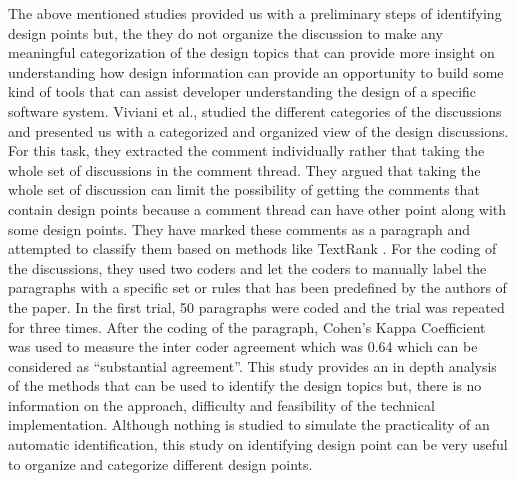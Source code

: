 The above mentioned studies provided us with a preliminary steps of identifying design points but, the they do not organize the discussion to make any meaningful categorization of the design topics that can provide more insight on understanding how design information can provide an opportunity to build some kind of tools that can assist developer understanding the design of a specific software system. Viviani et al.,\cite{Viviani2018} studied the different categories of the discussions and presented us with a categorized and organized view of the design discussions. For this task, they extracted the comment individually rather that taking the whole set of discussions in the comment thread. They argued that taking the whole set of discussion can limit the possibility of getting the comments that contain design points because a comment thread can have other point along with some design points. They have marked these comments as a paragraph and attempted to classify them based on methods like TextRank \cite{Mihalcea2004}. For the coding of the discussions, they used two coders and let the coders to manually label the paragraphs with a specific set or rules that has been predefined by the authors of the paper. In the first trial, 50 paragraphs were coded and the trial was repeated for three times. After the coding of the paragraph, Cohen's Kappa Coefficient was used to measure the inter coder agreement which was 0.64 which can be considered as ``substantial agreement''. This study provides an in depth analysis of the methods that can be used to identify the design topics but, there is no information on the approach, difficulty and feasibility of the technical implementation. Although nothing is studied to simulate the practicality of an automatic identification, this study on identifying design point can be very useful to organize and categorize different design points.           